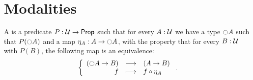 \documentclass[hott-all.tex]{subfiles}
\begin{document}
\section{Modalities}
% 
% 
% 
% 
\begin{defn}
  A 
  is a predicate $P:\mathcal{U}\to\mathsf{Prop}$ such that
  for every $A:\mathcal{U}$ we have a type $\ocircle A$ such that $P(\ocircle A)$ and a map
  $\eta_A:A\to\ocircle A$, with the property that for every $B:\mathcal{U}$ with $P(B)$, the following map is an equivalence:
  \[\left\{\begin{array}{rcl}(\ocircle A\to{}B) & \longrightarrow & (A\to{}B) \\ f & \longmapsto & f\circ\eta_A \end{array}\right..\]
\end{defn}
% 
% 
% 
\end{document}
